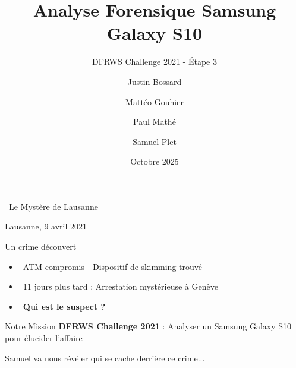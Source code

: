 \documentclass{beamer}
\title[Mobile Forensics]{Analyse Forensique Samsung Galaxy S10}
\subtitle{DFRWS Challenge 2021 - Étape 3}
\author{Justin Bossard \and Mattéo Gouhier \and Paul Mathé \and Samuel Plet}
\institute{UQAC - Atelier Pratique en Cybersécurité}
\date{Octobre 2025}
\begin{document}
\begin{frame}
\titlepage
\end{frame}


\begin{frame}{\faSearch \, Le Mystère de Lausanne}
\begin{center}
\Large{\textcolor{crimsonred}{Lausanne, 9 avril 2021}}
\end{center}

\begin{block}{Un crime découvert}
\begin{itemize}
    \item \faMapMarker \, ATM compromis - Dispositif de skimming trouvé
    \item \faCalendar \, 11 jours plus tard : Arrestation mystérieuse à Genève
    \item \faQuestion \, \textbf{Qui est le suspect ?}
\end{itemize}
\end{block}

\begin{alertblock}{Notre Mission}
\textbf{DFRWS Challenge 2021} : Analyser un Samsung Galaxy S10 pour élucider l'affaire
\end{alertblock}

\pause
\begin{center}
\Large{\textcolor{hydroblue}{Samuel va nous révéler qui se cache derrière ce crime...}}
\end{center}
\end{frame}
\end{document}
